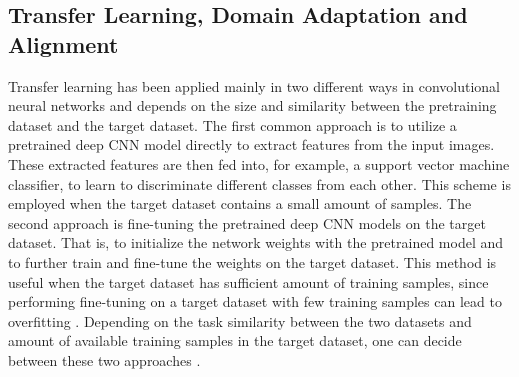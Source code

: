 \documentclass[11pt,journal,compsoc]{IEEEtran}
\begin{document}
\subsection{Transfer Learning, Domain Adaptation and Alignment}\label{subsec2.6}
Transfer learning has been applied mainly in two different ways in convolutional neural networks and depends on the size and similarity between the pretraining dataset and the target dataset. The first common approach is to utilize a pretrained deep CNN model directly to extract features from the input images. These extracted features are then fed into, for example, a support vector machine classifier, to learn to discriminate different classes from each other. This scheme is employed when the target dataset contains a small amount of samples. The second approach is fine-tuning the pretrained deep CNN models on the target dataset. That is, to initialize the network weights with the pretrained model and to further train and fine-tune the weights on the target dataset. This method is useful when the target dataset has sufficient amount of training samples, since performing fine-tuning on a target dataset with few training samples can lead to overfitting \cite{Yosinski_2014}. Depending on the task similarity between the two datasets and amount of available training samples in the target dataset, one can decide between these two approaches \cite{Lecun_2015}.
\end{document}
